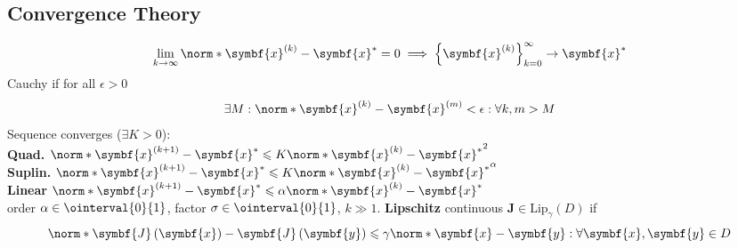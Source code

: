 \documentclass{article}
\begin{document}
\begin{minipage}[t]{62.39259259mm}
    \subsection{Convergence Theory}
    \begin{equation*}
        \lim_{k \to \infty} \norm*{\symbf{x}^{\left( k \right)} - \symbf{x}^\ast} = 0 \implies \left\{ \symbf{x}^{\left( k \right)} \right\}_{k = 0}^\infty \to \symbf{x}^\ast
    \end{equation*}
    Cauchy if for all \(\epsilon > 0\)
    \begin{equation*}
        \exists M : \norm*{\symbf{x}^{\left( k \right)} - \symbf{x}^{\left( m \right)}} < \epsilon : \forall k,m > M
    \end{equation*}
    Sequence converges (\(\exists K > 0\)):\\
    \textbf{Quad.} \(\norm*{\symbf{x}^{\left( k+1 \right)} - \symbf{x}^\ast} \leqslant K \norm*{\symbf{x}^{\left( k \right)} - \symbf{x}^\ast}^2\) \\
    \textbf{Suplin.} \(\norm*{\symbf{x}^{\left( k+1 \right)} - \symbf{x}^\ast} \leqslant K \norm*{\symbf{x}^{\left( k \right)} - \symbf{x}^\ast}^\alpha\) \\
    \textbf{Linear} \(\norm*{\symbf{x}^{\left( k+1 \right)} - \symbf{x}^\ast} \leqslant \alpha \norm*{\symbf{x}^{\left( k \right)} - \symbf{x}^\ast}\) \\
    order \(\alpha \in \ointerval{0}{1}\), factor \(\sigma \in \ointerval{0}{1}\), \(k \gg 1\).
    \textbf{Lipschitz} continuous \(\symbf{J} \in \mathrm{Lip}_\gamma\left( D \right)\) if
    \begin{equation*}
        \norm*{\symbf{J}\left( \symbf{x} \right) - \symbf{J}\left( \symbf{y} \right)} \leqslant \gamma \norm*{\symbf{x} - \symbf{y}} : \forall \symbf{x}, \symbf{y} \in D
    \end{equation*}

\end{minipage}
\end{document}

